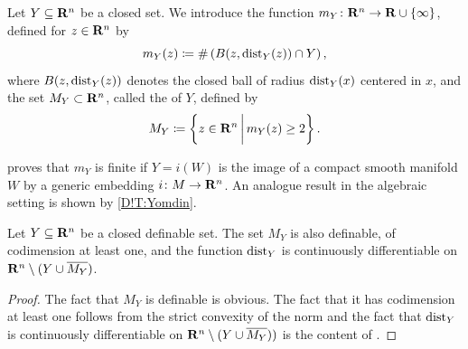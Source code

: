 \begin{definition}
\label{D!def:medial}
  Let $Y \subseteq \mathbf{R}^n$ be a closed set. We introduce the function $m_{Y} \colon \mathbf{R}^n \to \mathbf{R} \cup \{\infty\}$, defined for $z \in \mathbf{R}^n$ by
  \[
    m_Y(z) \coloneq \#\left(B(z, \operatorname{dist}_Y(z)) \cap Y\right),
  \]
  where $B(z, \operatorname{dist}_Y(z))$ denotes the closed ball of radius $\operatorname{dist}_Y(x)$ centered in $x$, and the set $M_Y \subset \mathbf{R}^n$, called the  of $Y$, defined by
  \[
    M_{Y} \coloneq \left\{z\in \mathbf{R}^n\,\bigg|\, m_Y(z)\geq 2\right\}.
    \qedhere
  \]
\end{definition}


\begin{remark}
  \cite[Prop.\ 3]{Yomdin1981} proves that $m_Y$ is finite if $Y = i(W)$ is the image of a  compact smooth manifold $W$ by a generic embedding $i \colon M \to \mathbf{R}^n$. An analogue result in the algebraic setting is shown by \cref{D!T:Yomdin}. 
\end{remark}


\begin{lemma}
\label{D!L:useful}
  Let $Y \subseteq \mathbf{R}^n$ be a closed definable set. The set $M_Y$ is also definable, of codimension at least one, and the function $\operatorname{dist}_Y$ is continuously differentiable on $\mathbf{R}^n \setminus (Y \cup \overline {M_Y})$.
\end{lemma}

\begin{proof}
  The fact that $M_Y$ is definable is obvious. The fact that it has codimension at least one follows from the strict convexity of the norm and the fact that $\operatorname{dist}_Y$ is continuously differentiable on $\mathbf{R}^n \setminus (Y \cup \overline {M_Y}))$ is the content of \cite[Theorem 4.8(5)]{Federer1959}.
\end{proof}



